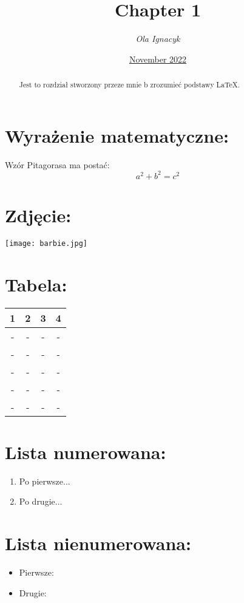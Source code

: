\documentclass[12pkt,a4paper]{article}
\title{\textbf{Chapter 1}}
\author{\textit{Ola Ignacyk}}
\date{\underline{November 2022}}
\begin{document}
\maketitle

\begin{abstract}
    Jest to rozdział stworzony przeze mnie b zrozumieć podstawy LaTeX.
\end{abstract}


\section{ Wyrażenie matematyczne:}
Wzór Pitagorasa ma postać:
 \[a^2+b^2=c^2\]

 \section{Zdjęcie:}

\begin{center}
   \texttt{[image: barbie.jpg]} 
    \label{fig:zdjecie}
\end{center}


\section{Tabela:}
\begin{table}[h!]
\centering
\begin{tabular}{||c c c c||} 
 \hline
 1 & 2 & 3 & 4 \\ [0.5ex] 
 \hline\hline
 - & - & - & - \\ 
 - & - & - & - \\
 - & - & - & - \\
 - & - & - & - \\
 - & - & - & - \\ [1ex] 
 \hline
\end{tabular}
\label{table:tabela}
\end{table}

\section{Lista numerowana:}
\begin{enumerate}
    \item Po pierwsze...
    \item Po drugie...
\end{enumerate}


\section{Lista nienumerowana:}
\begin{itemize}
    \item Pierwsze:
    \item Drugie:
\end{itemize}
\end{document}
